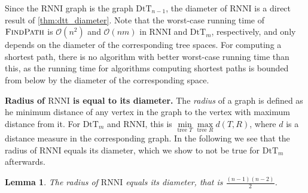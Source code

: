 \documentclass[11pt]{amsart}
\newtheorem{lemma}{Lemma}
\newcommand{\rnni}{\mathrm{RNNI}}
\newcommand{\findpath}{\textsc{FindPath}}
\newcommand{\dtt}{\mathrm{DtT}}
\renewcommand{\O}{\mathcal O}
\newcommand{\summary}[1]{\textbf{#1}} %
\begin{document}
Since the $\rnni$ graph is the graph $\dtt_{n-1}$, the diameter of $\rnni$ is a direct result of \autoref{thm:dtt_diameter}.
Note that the worst-case running time of $\findpath$ is $\O(n^2)$ and $\O(nm)$ in $\rnni$ and $\dtt_m$, respectively, and only depends on the diameter of the corresponding tree spaces.
For computing a shortest path, there is no algorithm with better worst-case running time than this, as the running time for algorithms computing shortest paths is bounded from below by the diameter of the corresponding space.

\summary{Radius of $\rnni$ is equal to its diameter.}
The \emph{radius} of a graph is defined as he minimum distance of any vertex in the graph to the vertex with maximum distance from it.
For $\dtt_m$ and $\rnni$, this is $\min\limits_{\text{tree } T}\max\limits_{\text{tree }R} d(T,R)$, where $d$ is a distance measure in the corresponding graph.
In the following we see that the radius of $\rnni$ equals its diameter, which we show to not be true for $\dtt_m$ afterwards.

\begin{lemma}
	The radius of $\rnni$ equals its diameter, that is $\frac{(n-1)(n-2)}{2}$.
	\label{lemma:radius_rnni}
\end{lemma}
\end{document}

